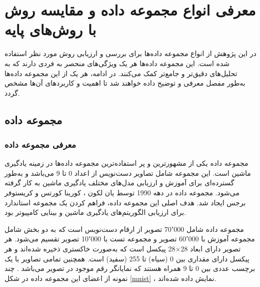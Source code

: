\section{
	معرفی انواع مجموعه داده و مقایسه روش
	با روش‌های پایه
}
در این پژوهش از انواع مجموعه داده‌ها برای بررسی و ارزیابی روش مورد نظر استفاده شده است. این مجموعه داده‌ها هر یک ویژگی‌های منحصر به فردی دارند که به تحلیل‌های دقیق‌تر و جامع‌تر کمک می‌کنند. در ادامه، هر یک از این مجموعه داده‌ها به‌طور مفصل معرفی و توضیح داده خواهند شد تا اهمیت و کاربردهای آن‌ها مشخص گردد.


\subsection{
مجموعه داده
}

\vspace{3mm}
\subsubsection{
	معرفی مجموعه داده
}\vspace{-1mm}

مجموعه داده
یکی از مشهورترین و پر استفاده‌ترین مجموعه داده‌ها در زمینه یادگیری ماشین است. این مجموعه شامل تصاویر دست‌نویس از اعداد 0 تا 9 می‌باشد و به‌طور گسترده‌ای برای آموزش و ارزیابی مدل‌های مختلف یادگیری ماشین به کار گرفته می‌شود.
مجموعه داده
در دهه 1990 توسط یان لکون%
،
کورینا کورتس%
و کریستوفر برجس%
 ایجاد شد. هدف اصلی این مجموعه داده، فراهم کردن یک مجموعه استاندارد برای ارزیابی الگوریتم‌های یادگیری ماشین و بینایی کامپیوتر بود.

مجموعه داده
شامل 70٬000 تصویر از ارقام دست‌نویس است که به دو بخش شامل مجموعه آموزش با 60٬000 تصویر و مجموعه تست با 10٬000 تصویر تقسیم می‌شود. هر تصویر دارای ابعاد
28$\times$28
پیکسل است که به‌صورت خاکستری%
ذخیره شده‌اند و هر پیکسل دارای مقداری بین 0 (سیاه) تا 255 (سفید) است. همچنین تمامی تصاویر با یک برچسب عددی بین 0 تا 9 همراه هستند که نمایانگر رقم موجود در تصویر می‌باشد
\cite{lecun1998gradient}.
چند نمونه از اعضای این مجموعه داده در شکل
\ref{mnist}%
، نمایش داده شده‌اند.

